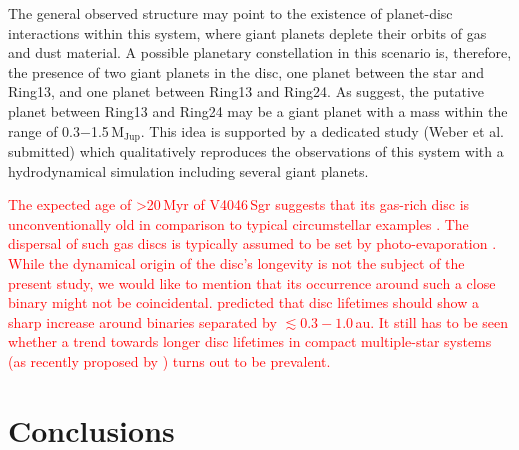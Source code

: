 \documentclass[fleqn,usenatbib,useAMS]{mnras}
\newcommand{\red}[1]{\textcolor{red}{#1}}
\begin{document}
The general observed structure may point to the existence of planet-disc interactions within this system, where giant planets deplete their orbits of gas and dust material. A possible planetary constellation in this scenario is, therefore, the presence of two giant planets in the disc, one planet between the star and Ring13, and one planet between Ring13 and Ring24. As \citet{Ru_z_Rodr_guez_2019} suggest, the putative planet between Ring13 and Ring24 may be a giant planet with a mass within the range of 0.3$-$1.5\,$\mathrm{M}_{\mathrm{Jup}}$. This idea is supported by a dedicated study (Weber et al. submitted) which qualitatively reproduces the observations of this system with a hydrodynamical simulation including several giant planets.

\red{The expected age of >20\,Myr of V4046\,Sgr suggests that its gas-rich disc is unconventionally old in comparison to typical circumstellar examples \citep[e.g.][]{Fedele2010, Williams2011}. The dispersal of such gas discs is typically assumed to be set by photo-evaporation \citep{Alexander2006,Gorti2009}. While the dynamical origin of the disc’s longevity is not the subject of the present study, we would like to mention that its occurrence around such a close binary might not be coincidental. \citet{Alexander2012} predicted that disc lifetimes should show a sharp increase around binaries separated by $\lesssim 0.3-1.0\,$au. It still has to be seen whether a trend towards longer disc lifetimes in compact multiple-star systems (as recently proposed by \citealp{Ronco2021}) turns out to be prevalent.}

\section{Conclusions} \label{sec:Conclusions}
\end{document}
